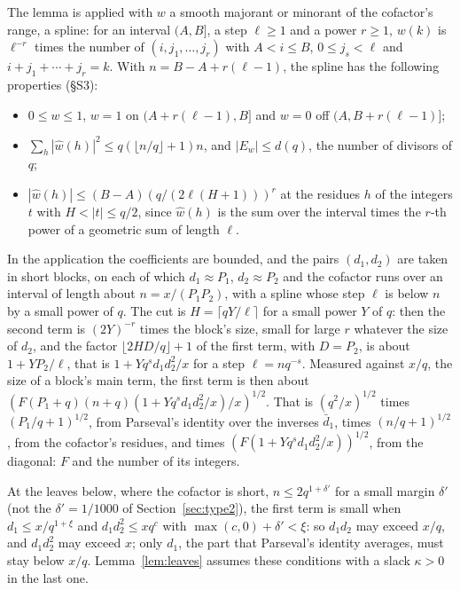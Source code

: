 \documentclass[11pt]{article}
\theoremstyle{definition}
\begin{document}
The lemma is applied with $w$ a smooth majorant or minorant of the cofactor's range, a spline: for an interval
$(A, B]$, a step $\ell \ge 1$ and a power $r \ge 1$, $w(k)$ is $\ell^{-r}$ times the number of $(i, j_1, \dots, j_r)$
with $A < i \le B$, $0 \le j_s < \ell$ and $i + j_1 + \cdots + j_r = k$. With $n = B - A + r(\ell - 1)$, the spline
has the following properties (\S S3):
\begin{itemize}
\item $0 \le w \le 1$, $w = 1$ on $(A + r(\ell - 1), B]$ and $w = 0$ off $(A, B + r(\ell - 1)]$;
\item $\sum_h |\hat w(h)|^2 \le q(\lfloor n/q \rfloor + 1) n$, and $|E_w| \le d(q)$, the number of divisors of $q$;
\item $|\hat w(h)| \le (B - A)(q/(2\ell(H + 1)))^r$ at the residues $h$ of the integers $t$ with $H < |t| \le q/2$,
  since $\hat w(h)$ is the sum over the interval times the $r$-th power of a geometric sum of length $\ell$.
\end{itemize}

In the application the coefficients are bounded, and
the pairs $(d_1, d_2)$ are taken in short blocks, on each of which $d_1 \approx P_1$, $d_2 \approx P_2$ and the cofactor
runs over an interval of length about $n = x/(P_1 P_2)$, with a spline whose step $\ell$ is below $n$ by a small power
of $q$. The cut is $H = \lceil qY/\ell \rceil$ for a small power $Y$ of $q$: then the second term is $(2Y)^{-r}$ times
the block's size, small for large $r$ whatever the size of $d_2$, and the factor $\lfloor 2HD/q \rfloor + 1$ of the
first term, with $D = P_2$, is about $1 + Y P_2/\ell$, that is $1 + Y q^{s} d_1 d_2^2/x$ for a step $\ell = n q^{-s}$.
Measured against $x/q$, the size of a block's main term, the first term is then about
$(F(P_1 + q)(n + q)(1 + Y q^s d_1 d_2^2/x)/x)^{1/2}$. That is $(q^2/x)^{1/2}$ times $(P_1/q + 1)^{1/2}$, from
Parseval's identity over the inverses $\bar d_1$, times $(n/q + 1)^{1/2}$, from the cofactor's residues, and times
$(F(1 + Y q^s d_1 d_2^2/x))^{1/2}$, from the diagonal: $F$ and the number of its integers.

At the leaves below, where the cofactor is short, $n \le 2q^{1 + \delta'}$ for a small margin $\delta'$ (not the
$\delta' = 1/1000$ of Section~\ref{sec:type2}), the first term is small when $d_1 \le x/q^{1 + \xi}$ and
$d_1 d_2^2 \le x q^c$ with
$\max(c, 0) + \delta' < \xi$: so $d_1 d_2$ may exceed $x/q$, and $d_1 d_2^2$ may exceed $x$; only $d_1$, the part that
Parseval's identity averages, must stay below $x/q$. Lemma~\ref{lem:leaves} assumes these conditions with a slack
$\kappa > 0$ in the last one.
\end{document}
